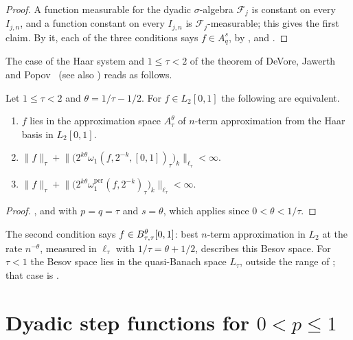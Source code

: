 \begin{proof}
\leanok
A function measurable for the dyadic $\sigma$-algebra $\mathcal{F}_j$ is constant on every
$I_{j,n}$, and a function constant on every $I_{j,n}$ is $\mathcal{F}_j$-measurable; this
gives the first claim. By it, each of the three conditions says $f \in A^s_q$, by
,  and .
\end{proof}

The case of the Haar system and $1 \leq \tau < 2$ of the theorem of DeVore, Jawerth and
Popov~\cite{DeVoreJawerthPopov} (see also \cite[\S3.6 and Remark~7.6]{DeVore1998}) reads as
follows.

\begin{corollary}
\label{cor:haar-nterm-besov}
\leanok
{}
Let $1 \leq \tau < 2$ and $\theta = 1/\tau - 1/2$. For $f \in L_2[0, 1]$ the following are
equivalent.
\begin{enumerate}
  \item $f$ lies in the approximation space $A^\theta_\tau$ of $n$-term approximation from the
    Haar basis in $L_2[0, 1]$.
  \item $\|f\|_\tau + \bigl\| \bigl( 2^{k\theta} \omega_1(f, 2^{-k}, [0,1])_\tau \bigr)_k
    \bigr\|_{\ell_\tau} < \infty$.
  \item $\|f\|_\tau + \bigl\| \bigl( 2^{k\theta} \omega_1^{\mathrm{per}}(f, 2^{-k})_\tau
    \bigr)_k \bigr\|_{\ell_\tau} < \infty$.
\end{enumerate}
\end{corollary}

\begin{proof}
\leanok
{}, and  with $p = q = \tau$ and $s = \theta$,
which applies since $0 < \theta < 1/\tau$.
\end{proof}

The second condition says $f \in B^{\theta}_{\tau,\tau}[0, 1]$: best $n$-term approximation
in $L_2$ at the rate $n^{-\theta}$, measured in $\ell_\tau$ with $1/\tau = \theta + 1/2$,
describes this Besov space. For $\tau < 1$ the Besov space lies in the quasi-Banach space
$L_\tau$, outside the range of ; that case is
.

\section{Dyadic step functions for \texorpdfstring{$0 < p \leq 1$}{0 < p <= 1}}
\label{sec:steps-below-one}

